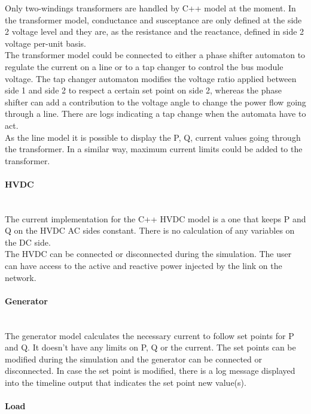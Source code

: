\documentclass[a4paper, 12pt]{report}
\begin{document}
Only two-windings transformers are handled by \Dynawo C++ model at the moment. In the transformer model, conductance and susceptance are only defined at the side 2 voltage level and they are, as the resistance and the reactance, defined in side 2 voltage per-unit basis. \\
The transformer model could be connected to either a phase shifter automaton to regulate the current on a line or to a tap changer to control the bus module voltage. The tap changer automaton modifies the voltage ratio applied between side 1 and side 2 to respect a certain set point on side 2, whereas the phase shifter can add a contribution to the voltage angle to change the power flow going through a line. There are logs indicating a tap change when the automata have to act. \\
As the line model it is possible to display the P, Q, current values going through the transformer. In a similar way, maximum current limits could be added to the transformer. \\

\paragraph{HVDC}
~~\\

The current implementation for the C++ HVDC model is a one that keeps P and Q on the HVDC AC sides constant. There is no calculation of any variables on the DC side. \\
The HVDC can be connected or disconnected during the simulation. The user can have access to the active and reactive power injected by the link on the network. \\

\paragraph{Generator}
~~\\

The generator model calculates the necessary current to follow set points for P and Q. It doesn't have any limits on P, Q or the current. The set points can be modified during the simulation and the generator can be connected or disconnected. In case the set point is modified, there is a log message displayed into the timeline output that indicates the set point new value(s). \\

\paragraph{Load}
~~\\
\end{document}
